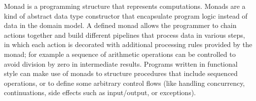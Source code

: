 Monad is a programming structure that represents computations. Monads are a kind of abstract data type constructor that encapsulate program logic instead of data in the domain model. A defined monad allows the programmer to chain actions together and build different pipelines that process data in various steps, in which each action is decorated with additional processing rules provided by the monad; for example a sequence of arithmetic operations can be controlled to avoid division by zero in intermediate results. Programs written in functional style can make use of monads to structure procedures that include sequenced operations, or to define some arbitrary control flows (like handling concurrency, continuations, side effects such as input/output, or exceptions).

